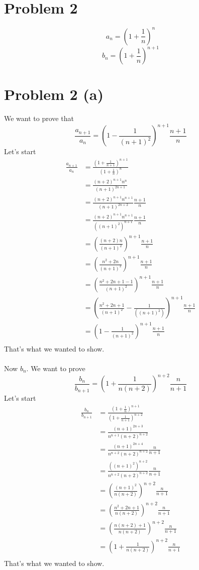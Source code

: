 \documentclass{article}
\begin{document}
\section*{Problem 2}
\[
   a_n = (1 + \frac{1}{n})^n
\]
\[
   b_n = (1 + \frac{1}{n})^{n+1}
\]

\section*{Problem 2 (a)}
We want to prove that
\[
   \frac{a_{n + 1}}{a_n} = \left(1 - \frac{1}{(n+1)^2} \right)^{n+1} \frac{n+1}{n}
\]
Let's start
\begin{align*}
   \frac{a_{n+1}}{a_n} & = \frac{(1 + \frac{1}{n+1})^{n+1}}{(1 + \frac{1}{n})^n}                               \\
                        &= \frac{(n+2)^{n+1}n^n}{(n+1)^{2n+1}} \\
                        &= \frac{(n+2)^{n+1}n^{n+1}}{(n+1)^{2n+2}} \frac{n+1}{n} \\
                        &= \frac{(n+2)^{n+1}n^{n+1}}{((n+1)^2)^{n+1}} \frac{n+1}{n} \\
                        &= (\frac{(n+2)n}{(n+1)^2})^{n+1} \frac{n+1}{n} \\
                        &= (\frac{n^2+2n}{(n+1)^2})^{n+1} \frac{n+1}{n} \\
                        &= (\frac{n^2+2n+1 -1}{(n+1)^2})^{n+1} \frac{n+1}{n} \\
                        &= (\frac{n^2+2n+1}{(n+1)^2} - \frac{1}{((n+1)^2)})^{n+1} \frac{n+1}{n} \\
                        &= (1 - \frac{1}{(n+1)^2})^{n+1} \frac{n+1}{n} \\
\end{align*}
That's what we wanted to show. \\
\\
Now \(b_n\). We want to prove
\[
   \frac{b_n}{b_{n+1}} = \left(1 + \frac{1}{n(n+2)} \right)^{n+2} \frac{n}{n+1}
\]
Let's start
\begin{align*}
   \frac{b_n}{b_{n+1}} & = \frac{(1 + \frac{1}{n})^{n+1}}{(1 + \frac{1}{n+1})^{n+2}}                               \\
                        &= \frac{(n+1)^{2n+3}}{n^{n+1}(n+2)^{n+2}} \\
                        &= \frac{(n+1)^{2n+4}}{n^{n+2}(n+2)^{n+2}} \frac{n}{n+1} \\
                        &= \frac{((n+1)^2)^{n+2}}{n^{n+2}(n+2)^{n+2}} \frac{n}{n+1} \\
                        &= (\frac{(n+1)^2}{n(n+2)})^{n+2} \frac{n}{n+1} \\
                        &= (\frac{n^2 +2n + 1}{n(n+2)})^{n+2} \frac{n}{n+1} \\
                        &= (\frac{n(n+2) + 1}{n(n+2)})^{n+2} \frac{n}{n+1} \\
                        &= (1 + \frac{1}{n(n+2)})^{n+2} \frac{n}{n+1} \\
\end{align*}
That's what we wanted to show.
\end{document}
